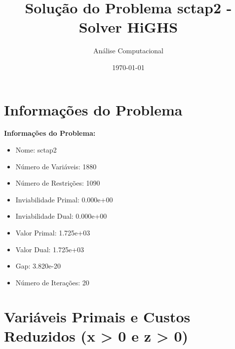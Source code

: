 \documentclass[12pt]{article}
\title{Solução do Problema sctap2 - Solver HiGHS}
\author{Análise Computacional}
\date{\today}
\begin{document}
\maketitle

\section{Informações do Problema}

\textbf{Informações do Problema:}
\begin{itemize}
\item Nome: sctap2
\item Número de Variáveis: 1880
\item Número de Restrições: 1090
\item Inviabilidade Primal: 0.000e+00
\item Inviabilidade Dual: 0.000e+00
\item Valor Primal: 1.725e+03
\item Valor Dual: 1.725e+03
\item Gap: 3.820e-20
\item Número de Iterações: 20
\end{itemize}


\section{Variáveis Primais e Custos Reduzidos (x > 0 e z > 0)}
\end{document}
